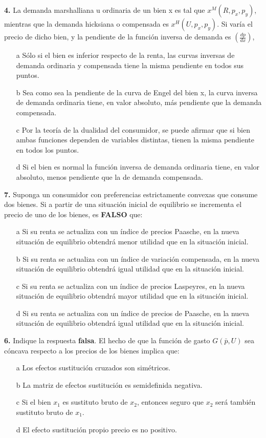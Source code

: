 \documentclass{nuevotema}
\begin{document}

\textbf{4.} La demanda marshalliana u ordinaria de un bien x es tal que $x^M(R, p_x, p_y)$, mientras que la demanda hicksiana o compensada es $x^H(U, p_x, p_y)$. Si varía el precio de dicho bien, y la pendiente de la función inversa de demanda es $\left( \frac{ dp}{dx} \right)$, 
\begin{enumerate}
    \item[a] Sólo si el bien es inferior respecto de la renta, las curvas inversas de demanda ordinaria y compensada tiene la misma pendiente en todos sus puntos.
    \item[b] Sea como sea la pendiente de la curva de Engel del bien x, la curva inversa de demanda ordinaria tiene, en valor absoluto, más pendiente que la demanda compensada.
    \item[c] Por la teoría de la dualidad del consumidor, se puede afirmar que si bien ambas funciones dependen de variables distintas, tienen la misma pendiente en todos los puntos.
    \item[d] Si el bien es normal la función inversa de demanda ordinaria tiene, en valor absoluto, menos pendiente que la de demanda compensada.
\end{enumerate}

\textbf{7.} Suponga un consumidor con preferencias estrictamente convexas que consume dos bienes. Si a partir de una situación inicial de equilibrio se incrementa el precio de uno de los bienes, es \textbf{FALSO} que:
\begin{enumerate}
	\item[a] Si su renta se actualiza con un índice de precios Paasche, en la nueva situación de equilibrio obtendrá menor utilidad que en la situación inicial.
	\item[b] Si su renta se actualiza con un índice de variación compensada, en la nueva situación de equilibrio obtendrá igual utilidad que en la situación inicial.
	\item[c] Si su renta se actualiza con un índice de precios Laspeyres, en la nueva situación de equilibrio obtendrá mayor utilidad que en la situación inicial.
	\item[d] Si su renta se actualiza con un índice de precios de Paasche, en la nueva situación de equilibrio obtendrá igual utilidad que en la situación inicial.
\end{enumerate}

\textbf{6.} Indique la respuesta \textbf{falsa}. El hecho de que la función de gasto $G(\bar{p}, U)$ sea cóncava respecto a los precios de los bienes implica que:
\begin{enumerate}
	\item[a] Los efectos sustitución cruzados son simétricos.
	\item[b] La matriz de efectos sustitución es semidefinida negativa.
	\item[c] Si el bien $x_1$ es sustituto bruto de $x_2$, entonces seguro que $x_2$ será también sustituto bruto de $x_1$.
	\item[d] El efecto sustitución propio precio es no positivo.
\end{enumerate}
\end{document}
